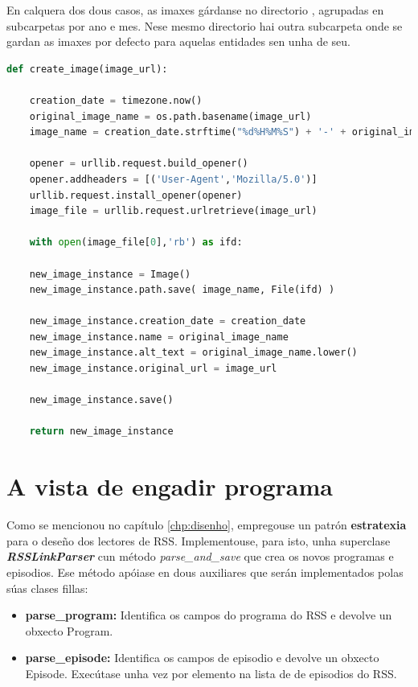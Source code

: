 En calquera dos dous casos, as imaxes gárdanse no directorio , agrupadas en subcarpetas por ano e mes. Nese mesmo directorio hai outra subcarpeta  onde se gardan as imaxes por defecto para aquelas entidades sen unha de seu.


\begin{lstlisting}[language=Python, caption=Código da función create\_image do módulo rss\_link\_parsers.py, label=lst:image]
def create_image(image_url):

	creation_date = timezone.now()
	original_image_name = os.path.basename(image_url)
	image_name = creation_date.strftime("%d%H%M%S") + '-' + original_image_name.lower()
	
	opener = urllib.request.build_opener()
	opener.addheaders = [('User-Agent','Mozilla/5.0')]
	urllib.request.install_opener(opener)
	image_file = urllib.request.urlretrieve(image_url)
	
	with open(image_file[0],'rb') as ifd: 
	
	new_image_instance = Image()
	new_image_instance.path.save( image_name, File(ifd) )
	
	new_image_instance.creation_date = creation_date
	new_image_instance.name = original_image_name
	new_image_instance.alt_text = original_image_name.lower()
	new_image_instance.original_url = image_url
	
	new_image_instance.save()
	
	return new_image_instance
\end{lstlisting}



\section{A vista de engadir programa}

Como se mencionou no capítulo \ref{chp:disenho}, empregouse un patrón \textbf{estratexia} para o deseño dos lectores de RSS. Implementouse, para isto, unha superclase \textbf{\textit{RSSLinkParser}} cun método \textit{parse\_and\_save} que crea os novos programas e episodios. Ese método apóiase en dous auxiliares que serán implementados polas súas clases fillas: 

\begin{itemize}
	\item \textbf{parse\_program:} Identifica os campos do programa do RSS e devolve un obxecto Program.
	\item \textbf{parse\_episode:} Identifica os campos de episodio e devolve un obxecto Episode. Execútase unha vez por elemento na lista de de episodios do RSS.
\end{itemize}

